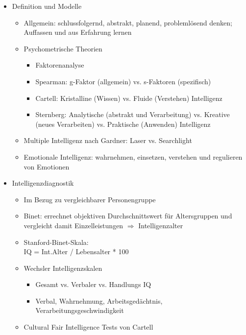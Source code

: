 \documentclass[11pt, paper=a4, twocolumn]{scrartcl}
\begin{document}
	\begin{itemize}
		\item Definition und Modelle
			\begin{itemize}
				\item Allgemein: schlussfolgernd, abstrakt, planend, 
					problemlösend denken; Auffassen und aus Erfahrung 
					lernen
				\item Psychometrische Theorien
					\begin{itemize}
						\item Faktorenanalyse
						\item Spearman: g-Faktor (allgemein) vs. 
							s-Faktoren (spezifisch)
						\item Cartell: Kristalline (Wissen) vs. 
							Fluide (Verstehen) Intelligenz
						\item Sternberg: Analytische (abstrakt und 
							Verarbeitung) vs. Kreative (neues 
							Verarbeiten) vs. Praktische 
							(Anwenden) Intelligenz

					\end{itemize}
				\item Multiple Intelligenz nach Gardner: Laser vs. 
					Searchlight
				\item Emotionale Intelligenz: wahrnehmen, einsetzen, 
					verstehen und regulieren von Emotionen
			\end{itemize}

		\item Intelligenzdiagnostik
			\begin{itemize}
				\item Im Bezug zu vergleichbarer Personengruppe
				\item Binet: errechnet objektiven Durchschnittswert für 
					Altersgruppen und vergleicht damit 
					Einzelleistungen $\Rightarrow$ Intelligenzalter
				\item Stanford-Binet-Skala: \\
					IQ = Int.Alter / Lebensalter * 100
				\item Wechsler Intelligenzskalen
					\begin{itemize}
						\item Gesamt vs. Verbaler vs. Handlungs 
							IQ
						\item Verbal, Wahrnehmung, 
							Arbeitsgedächtnis, 
							Verarbeitungsgeschwindigkeit
					\end{itemize}
				\item Cultural Fair Intelligence Tests von Cartell
			\end{itemize}



\end{itemize}
\end{document}
